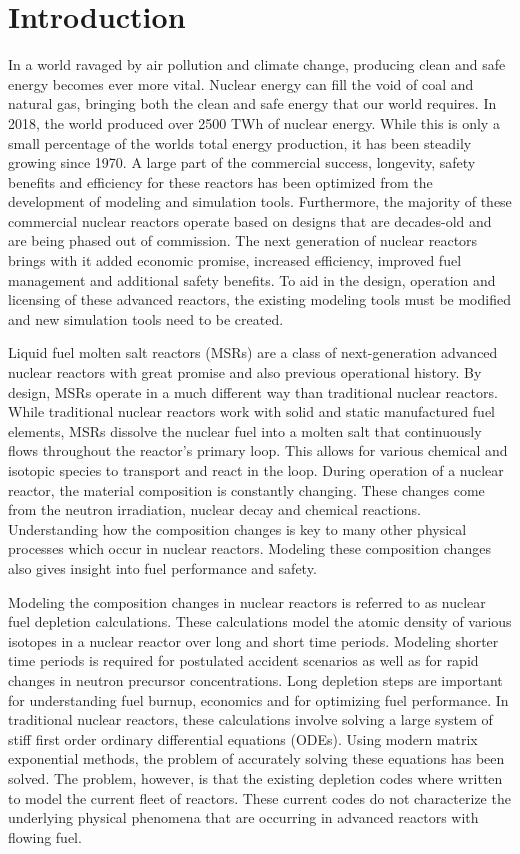 \chapter{Introduction} \label{ch:introduction}

In a world ravaged by air pollution and climate change, producing clean and safe energy becomes ever more vital. Nuclear energy can fill the void of coal and natural gas, bringing both the clean and safe energy that our world requires. In 2018, the world produced over 2500 TWh of nuclear energy. While this is only a small percentage of the worlds total energy production, it has been steadily growing since 1970. A large part of the commercial success, longevity, safety benefits and efficiency for these reactors has been optimized from the development of modeling and simulation tools. Furthermore, the majority of these commercial nuclear reactors operate based on designs that are decades-old and are being phased out of commission. The next generation of nuclear reactors brings with it added economic promise, increased efficiency, improved fuel management and additional safety benefits. To aid in the design, operation and licensing of these advanced reactors, the existing modeling tools must be modified and new simulation tools need to be created. 
 
Liquid fuel molten salt reactors (MSRs) are a class of next-generation advanced nuclear reactors with great promise and also previous operational history. By design, MSRs operate in a much different way than traditional nuclear reactors. While traditional nuclear reactors work with solid and static manufactured fuel elements, MSRs dissolve the nuclear fuel into a molten salt that continuously flows throughout the reactor's primary loop. This allows for various chemical and isotopic species to transport and react in the loop. During operation of a nuclear reactor, the material composition is constantly changing. These changes come from the neutron irradiation, nuclear decay and chemical reactions. Understanding how the composition changes is key to many other physical processes which occur in nuclear reactors. Modeling these composition changes also gives insight into fuel performance and safety. 

Modeling the composition changes in nuclear reactors is referred to as nuclear fuel depletion calculations. These calculations model the atomic density of various isotopes in a nuclear reactor over long and short time periods. Modeling shorter time periods is required for postulated accident scenarios as well as for rapid changes in neutron precursor concentrations. Long depletion steps are important for understanding fuel burnup, economics and for optimizing fuel performance. In traditional nuclear reactors, these calculations involve solving a large system of stiff first order ordinary differential equations (ODEs). Using modern matrix exponential methods, the problem of accurately solving these equations has been solved. The problem, however, is that the existing depletion codes where written to model the current fleet of reactors. These current codes do not characterize the underlying physical phenomena that are occurring in advanced reactors with flowing fuel. 

